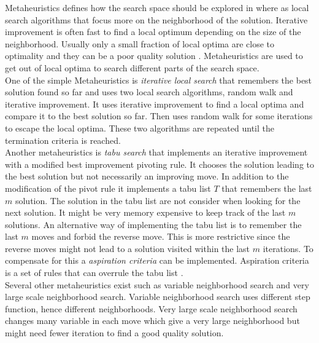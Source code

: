 Metaheuristics defines how the search space should be explored in where as local search algorithms that focus more on 
the neighborhood of the solution. Iterative improvement is often fast to find a local optimum depending on the size of 
the neighborhood. Usually only a small fraction of local optima are close to optimality and they can be a poor quality 
solution \cite[p.135]{lsbog}. Metaheuristics are used to get out of local optima to search different parts of the 
search space. \\
One of the simple Metaheuristics is \emph{iterative local search} that remembers the best solution 
found so far and uses two local search algorithms, random walk and iterative improvement. It uses iterative improvement 
to find a local optima and compare it to the best solution so far. Then uses random walk for some iterations to escape 
the local optima. These two algorithms are repeated until the termination criteria is reached. \\ 
Another metaheuristics is \emph{tabu search} that implements an iterative improvement with a modified best improvement 
pivoting rule. It chooses the solution leading to the best solution but not necessarily an improving move. In addition 
to the modification of the pivot rule it implements a tabu list $T$ that remembers the last $m$ solution. The solution 
in the tabu list are not consider when looking for the next solution. It might be very memory expensive to keep track 
of the last $m$ solutions. An alternative way of implementing the tabu list is to remember the last $m$ moves and 
forbid the reverse move. This is more restrictive since the reverse moves might not lead to a solution visited within 
the last $m$ iterations. To compensate for this a \emph{aspiration criteria} can be implemented. Aspiration criteria is 
a set of rules that can overrule the tabu list \cite[p.139-140]{lsbog}. \\
Several other metaheuristics exist such as variable neighborhood search and very large scale neighborhood search. 
Variable neighborhood search uses different step function, hence different neighborhoods. Very large scale neighborhood 
search changes many variable in each move which give a very large neighborhood but might need fewer iteration to find a 
good quality solution.  